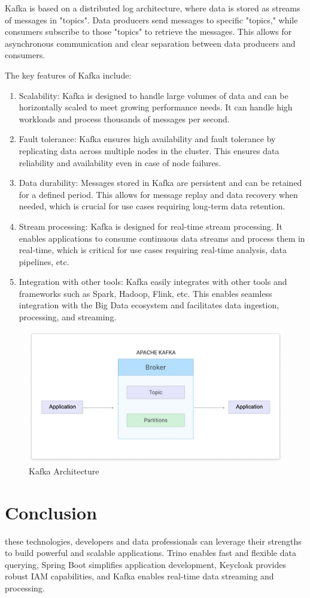 Kafka is based on a distributed log architecture, where data is stored as streams of messages in "topics". Data producers send messages to specific "topics," while consumers subscribe to those "topics" to retrieve the messages. This allows for asynchronous communication and clear separation between data producers and consumers.

The key features of Kafka include:

\begin{enumerate}
\item Scalability: Kafka is designed to handle large volumes of data and can be horizontally scaled to meet growing performance needs. It can handle high workloads and process thousands of messages per second.
\item Fault tolerance: Kafka ensures high availability and fault tolerance by replicating data across multiple nodes in the cluster. This ensures data reliability and availability even in case of node failures.
\item Data durability: Messages stored in Kafka are persistent and can be retained for a defined period. This allows for message replay and data recovery when needed, which is crucial for use cases requiring long-term data retention.
\item Stream processing: Kafka is designed for real-time stream processing. It enables applications to consume continuous data streams and process them in real-time, which is critical for use cases requiring real-time analysis, data pipelines, etc.
\item Integration with other tools: Kafka easily integrates with other tools and frameworks such as Spark, Hadoop, Flink, etc. This enables seamless integration with the Big Data ecosystem and facilitates data ingestion, processing, and streaming.
\end{enumerate}

\begin{figure}[H]
\centering
\includegraphics[width=\linewidth]{images/kafka.jpg}
\caption{Kafka Architecture}\label{fig:kafka}
\end{figure}

\section*{Conclusion}
these technologies, developers and data professionals can leverage their strengths to build powerful and scalable applications. Trino enables fast and flexible data querying, Spring Boot simplifies application development, Keycloak provides robust IAM capabilities, and Kafka enables real-time data streaming and processing.